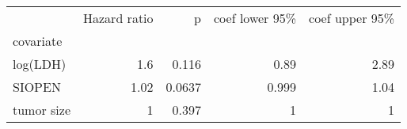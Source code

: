 \begin{tabular}{lrrrr}
\toprule
{} &  Hazard ratio &      p &  coef lower 95\% &  coef upper 95\% \\
covariate  &               &        &                  &                  \\
\midrule
log(LDH)   &           1.6 &  0.116 &             0.89 &             2.89 \\
SIOPEN     &          1.02 & 0.0637 &            0.999 &             1.04 \\
tumor size &             1 &  0.397 &                1 &                1 \\
\bottomrule
\end{tabular}

